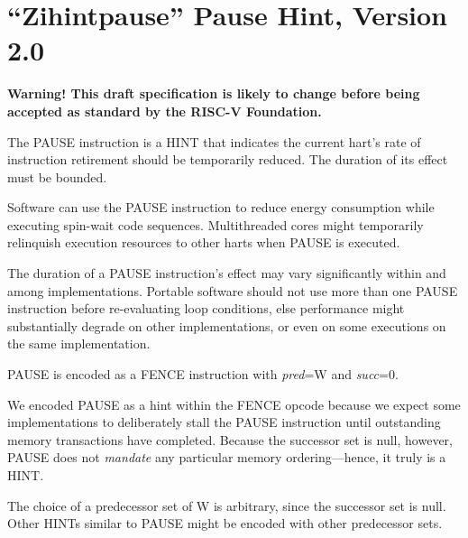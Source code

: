 \chapter{``Zihintpause'' Pause Hint, Version 2.0}
\label{chap:zihintpause}

{\bf Warning! This draft specification is likely to change before being
accepted as standard by the RISC-V Foundation.}

The PAUSE instruction is a HINT that indicates the current hart's rate of
instruction retirement should be temporarily reduced.  The duration of its
effect must be bounded.

\begin{commentary}
Software can use the PAUSE instruction to reduce energy consumption while
executing spin-wait code sequences.  Multithreaded cores might temporarily
relinquish execution resources to other harts when PAUSE is executed.

The duration of a PAUSE instruction's effect may vary significantly within and
among implementations.
Portable software should not use more than one PAUSE instruction before
re-evaluating loop conditions, else performance might substantially degrade on
other implementations, or even on some executions on the same implementation.
\end{commentary}

PAUSE is encoded as a FENCE instruction with {\em pred}=W and {\em succ}=0.

\begin{commentary}
We encoded PAUSE as a hint within the FENCE opcode because we expect some
implementations to deliberately stall the PAUSE instruction until outstanding
memory transactions have completed.
Because the successor set is null, however, PAUSE does not {\em mandate} any
particular memory ordering---hence, it truly is a HINT.

The choice of a predecessor set of W is arbitrary, since the successor set is
null.
Other HINTs similar to PAUSE might be encoded with other predecessor sets.
\end{commentary}
